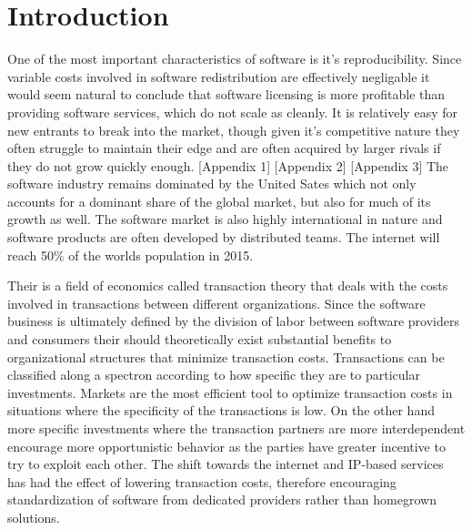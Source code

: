 \section*{Introduction}

One of the most important characteristics of software is it's reproducibility.\autocite[3]{buxmann2012software}
Since variable costs involved in software redistribution are effectively negligable it would seem natural to conclude that software licensing is more profitable than providing software services, which do not scale as cleanly.\autocite[3]{buxmann2012software}
It is relatively easy for new entrants to break into the market, though given it's competitive nature they often struggle to maintain their edge and are often acquired by larger rivals if they do not grow quickly enough.\autocite[]{ValuelineOverview}
[Appendix 1]
[Appendix 2]
[Appendix 3]
The software industry remains dominated by the United Sates which not only accounts for a dominant share of the global market, but also for much of its growth as well.\autocite[]{ITSoftwareEconomist}
The software market is also highly international in nature and software products are often developed by distributed teams.\autocite[3]{buxmann2012software}
The internet will reach 50\% of the worlds population in 2015.\autocite[]{ITSoftwareEconomist}

Their is a field of economics called transaction theory that deals with the costs involved in transactions between different organizations. Since the software business is ultimately defined by the division of labor between software providers and consumers their should theoretically exist substantial benefits to organizational structures that minimize transaction costs.\autocite[42]{buxmann2012software}
Transactions can be classified along a spectron according to how specific they are to particular investments. Markets are the most efficient tool to optimize transaction costs in situations where the specificity of the transactions is low. On the other hand more specific investments where the transaction partners are more interdependent encourage more opportunistic behavior as the parties have greater incentive to try to exploit each other.\autocite[44]{buxmann2012software}
The shift towards the internet and IP-based services has had the effect of lowering transaction costs, therefore encouraging standardization of software from dedicated providers rather than homegrown solutions.\autocite[46]{buxmann2012software}

